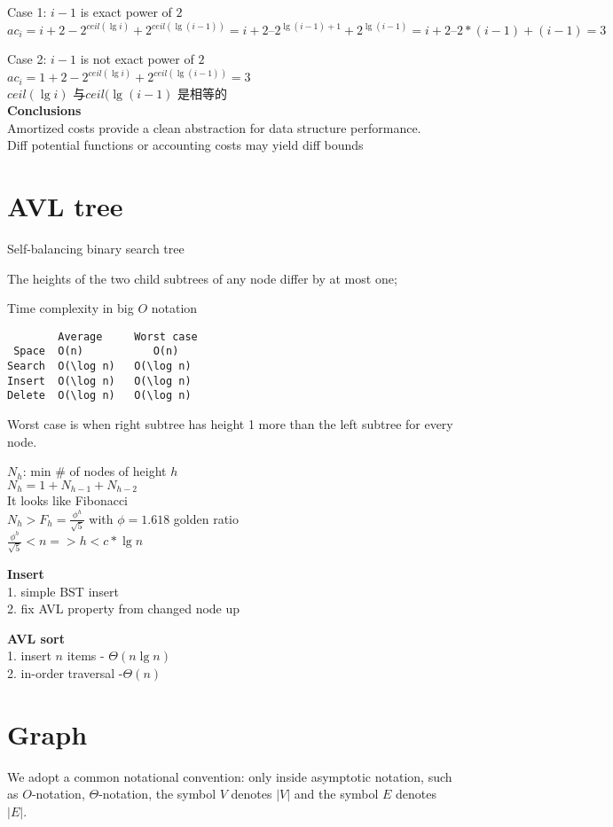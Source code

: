 \documentclass{article}
\begin{document}
Case 1: $i -1$ is exact power of $2$
$$
ac_i = i + 2 - 2^{ceil(\lg i)} + 2^{ceil(\lg (i-1))}
= i + 2 – 2^{\lg (i-1) + 1} + 2^{\lg (i-1)} = i + 2 – 2*(i-1) + (i-1) = 3
$$

Case 2: $i -1$ is not exact power of $2$\\
$ac_i = 1 + 2 - 2^{ceil(\lg i)} + 2^{ceil(\lg (i-1))} = 3$\\
$ceil(\lg i)$ 与$ceil(\lg (i-1)$ 是相等的\\

\textbf{Conclusions}\\
Amortized costs provide a clean abstraction for data structure performance.\\
Diff potential functions or accounting costs may yield diff bounds

\section{AVL tree}
\noindent
Self-balancing binary search tree

The heights of the two child subtrees of any node differ by at most one;

Time complexity in big $O$ notation
\begin{verbatim}
        Average  	Worst case
 Space	O(n)	       O(n)
Search	O(\log n)	O(\log n)
Insert	O(\log n)	O(\log n)
Delete	O(\log n)	O(\log n)
\end{verbatim}

Worst case is when right subtree has height  1 more than the left subtree for every node.

\noindent
$N_h$: min \# of nodes of height $h$\\
$N_h = 1+ N_{h-1} + N_{h-2}$\\
It looks like Fibonacci\\
$N_h > F_h = \frac{\phi^h}{\sqrt{5}}$ with $\phi = 1.618$  golden ratio\\
 $\frac{\phi^h}{\sqrt{5}} < n => h < c * \lg n$

\textbf{Insert}\\
1. simple BST insert\\
2. fix AVL property from changed node up

\textbf{AVL sort}\\
1. insert $n$ items - $\Theta(n\lg n)$\\
2. in-order traversal -$\Theta(n)$
\section{Graph}
We adopt a common notational convention: only inside asymptotic notation, such as $O$-notation, $\Theta$-notation, the symbol $V$ denotes $|V|$ and the symbol $E$ denotes $|E|$.
\end{document}
